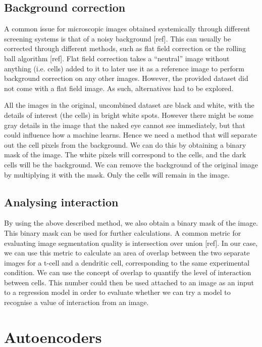 \documentclass{l4proj}
\begin{document}
\subsection{Background correction}

A common issue for microscopic images obtained systemically through different screening systems is that of a noisy background [ref]. This can usually be corrected through different methods, such as flat field correction or the rolling ball algorithm [ref]. Flat field correction takes a ``neutral” image without anything (i.e. cells) added to it to later use it as a reference image to perform background correction on any other images. However, the provided dataset did not come with a flat field image. As such, alternatives had to be explored.

\bigskip
All the images in the original, uncombined dataset are black and white, with the details of interest (the cells) in bright white spots. However there might be some gray details in the image that the naked eye cannot see immediately, but that could influence how a machine learns. Hence we need a method that will separate out the cell pixels from the background. We can do this by obtaining a binary mask of the image. The white pixels will correspond to the cells, and the dark cells will be the background. We can remove the background of the original image by multiplying it with the mask. Only the cells will remain in the image.

\subsection{Analysing interaction}

By using the above described method, we also obtain a binary mask of the image. This binary mask can be used for further calculations. A common metric for evaluating image segmentation quality is intersection over union [ref]. In our case, we can use this metric to calculate an area of overlap between the two separate images for a t-cell and a dendritic cell, corresponding to the same experimental condition. We can use the concept of overlap to quantify the level of interaction between cells. This number could then be used attached to an image as an input to a regression model in order to evaluate whether we can try a model to recognise a value of interaction from an image.

\section{Autoencoders}
\end{document}
